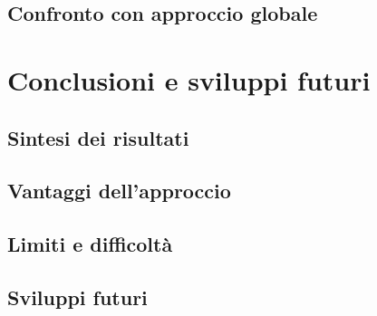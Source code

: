 \documentclass{report}
\begin{document}
\section{Confronto con approccio globale}

\chapter{Conclusioni e sviluppi futuri}
\section{Sintesi dei risultati}
\section{Vantaggi dell’approccio}
\section{Limiti e difficoltà}
\section{Sviluppi futuri}



\printbibliography




\end{document}
